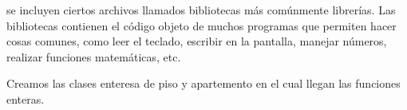 \documentclass[a4paper,12pt]{article}
\begin{document}
\par


\par


\noindent \begin{justify}
se incluyen ciertos archivos llamados bibliotecas más comúnmente librerías. Las bibliotecas contienen el código objeto de muchos programas que permiten hacer cosas comunes, como leer el teclado, escribir en la pantalla, manejar números, realizar funciones matemáticas, etc.
\end{justify}\par


\par


\par


\par


\par


\noindent {}\par


\noindent {}\par


\noindent {\fontsize{10pt}{10pt}\selectfont $ \} $;}\par


\par


\par


\par


\noindent Creamos las clases enteresa de piso y apartemento en el cual llegan las funciones enteras.\par
\end{document}
